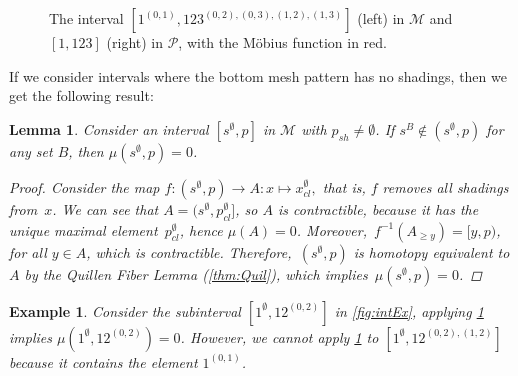 \documentclass[preprint,11pt]{elsarticle}
\newtheorem{lem}[thm]{Lemma}\crefname{lem}{Lemma}{Lemmas}
\newtheorem{ex}[thm]{Example}\crefname{ex}{Example}{Examples}
\newcommand\cl[1]{#1_{cl}}
\newcommand\sh[1]{#1_{sh}}
\numberwithin{equation}{section}
\numberwithin{figure}{section}
\numberwithin{thm}{section}
\begin{document}
\begin{figure}\centering
{}
\caption{The interval $[1^{(0,1)},123^{(0,2),(0,3),(1,2),(1,3)}]$
(left) in $\mathcal{M}$ and $[1,123]$ (right) in $\mathcal{P}$,
with the M\"obius function in red.}\label{fig:1-123}
\end{figure}

If we consider intervals where the bottom mesh pattern has no shadings, then we
get the following result:
\begin{lem}\label{lem:mu0}
Consider an interval $[s^\emptyset,p]$ in $\mathcal{M}$ with $\sh{p}\not=\emptyset$.
If $s^B\not\in(s^\emptyset,p)$ for any set $B$, then $\mu(s^\emptyset,p)=0$.
\begin{proof}
Consider the map $f:(s^\emptyset,p)\rightarrow A:x\mapsto\cl{x}^\emptyset,$ that is, $f$ removes all shadings from~$x$.
We can see that ${A=(s^\emptyset,\cl{p}^{\emptyset}]}$, so  $A$ is contractible, because it has the
unique maximal element~$\cl{p}^\emptyset$, hence $\mu(A)=0$. Moreover,~$f^{-1}(A_{\ge y})=[y,p)$,
for all $y\in A$, which is contractible. Therefore,~$(s^\emptyset,p)$ is homotopy equivalent
to $A$ by the Quillen Fiber Lemma (\cref{thm:Quil}), which implies~$\mu(s^\emptyset,p)=0$.
\end{proof}
\end{lem}
\begin{ex}
Consider the subinterval $[1^\emptyset,12^{(0,2)}]$ in \cref{fig:intEx},
applying \cref{lem:mu0} implies $\mu(1^\emptyset,12^{(0,2)})=0$. However, we cannot
apply \cref{lem:mu0} to $[1^\emptyset,12^{(0,2),(1,2)}]$ because it contains the
element $1^{(0,1)}$.
\end{ex}
\end{document}
